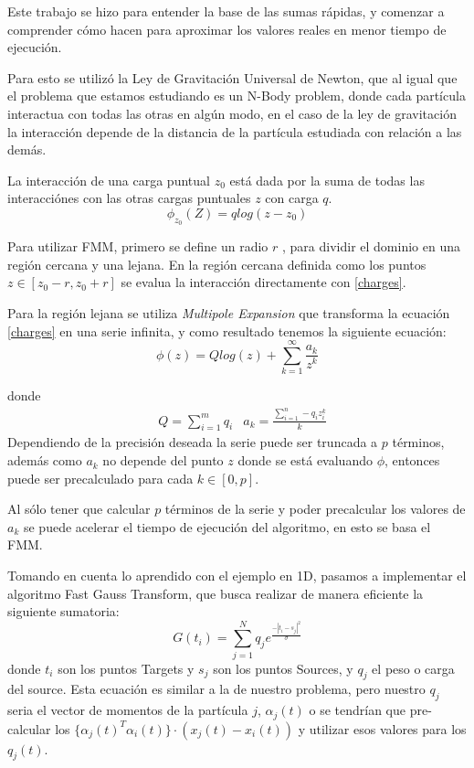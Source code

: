 \documentclass[letter, 10pt]{article}
\begin{document}
Este trabajo se hizo para entender la base de las sumas rápidas, y comenzar a comprender cómo hacen para aproximar los valores reales en menor tiempo de ejecución.

Para esto se utilizó la Ley de Gravitación Universal de Newton, que al igual que el problema que estamos estudiando es un N-Body problem, donde cada partícula interactua con todas las otras en algún modo, en el caso de la ley de gravitación la interacción depende de la distancia de la partícula estudiada con relación a las demás.

La interacción de una carga puntual $z_0$ está dada por la suma de todas las interacciónes con las otras cargas puntuales $z$ con carga $q$.
\begin{equation}
\phi_{z_0}(Z) = q log(z-z_0) \label{charges}
\end{equation}          

Para utilizar FMM, primero se define un radio $r$ , para dividir el dominio en una región cercana y una lejana. En la región cercana definida como los puntos $z \in [z_0 - r , z_0+ r]$ se evalua la interacción directamente con \ref{charges}. 

Para la región lejana se utiliza \textit{Multipole Expansion} que transforma la ecuación \ref{charges} en una serie infinita, y como resultado tenemos la siguiente ecuación:
\begin{equation}
\phi(z) = Q log(z) + \sum_{k=1}^\infty \frac{a_k}{z^k}
\end{equation}

donde 
\begin{align*}
    &Q = \sum_{i = 1}^m q_i    &a_k = \frac{\sum_{i = 1}^n -q_i z_i^k}{k}
\end{align*}
Dependiendo de la precisión deseada la serie puede ser truncada a $p$ términos, además como $a_k$ no depende del punto $z$ donde se está evaluando $\phi$, entonces puede ser precalculado para cada $k \in [0,p]$.

Al sólo tener que calcular $p$ términos de la serie y poder precalcular los valores de $a_k$ se puede acelerar el tiempo de ejecución del algoritmo, en esto se basa el FMM.

Tomando en cuenta lo aprendido con el ejemplo en 1D, pasamos a implementar el algoritmo Fast Gauss Transform, que busca realizar de manera eficiente la siguiente sumatoria:
\begin{equation}
G(t_i) = \sum_{j=1}^N q_j e^{\frac{-|t_i - s_j|^2}{\sigma}}
\end{equation}
donde $t_i$ son los puntos Targets y $s_j$ son los puntos Sources, y $q_j$ el peso o carga del source. Esta ecuación es similar a la de nuestro problema, pero nuestro $q_j$ seria el vector de momentos de la partícula $j$, $\alpha_j(t)$ o se tendrían que pre-calcular los $\{\alpha_j(t)^T \alpha_i(t) \} \cdot (x_j(t) - x_i(t)) $ y utilizar esos valores para los $q_j(t)$.
\end{document}
